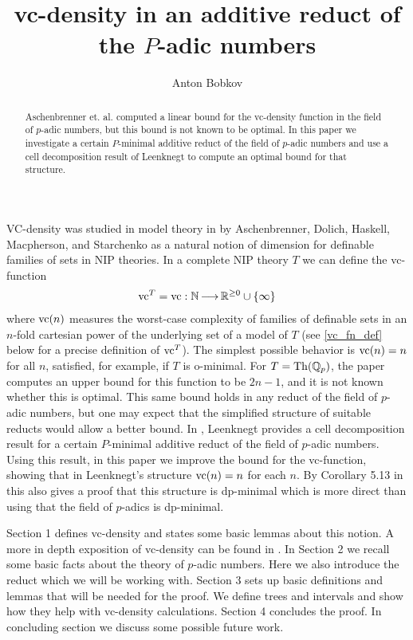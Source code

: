 \documentclass{amsart}
\title{vc-density in an additive reduct of the $P$-adic numbers}
\author{Anton Bobkov}
\begin{document}
\begin{abstract}
  Aschenbrenner et. al. computed a linear bound for the vc-density function in the field of $p$-adic numbers,
  but this bound is not known to be optimal.
  In this paper we investigate a certain $P$-minimal additive reduct of the field of $p$-adic numbers and
  use a cell decomposition result of Leenknegt to compute an optimal bound for that structure.
\end{abstract}

\maketitle

VC-density was studied in model theory in \cite{density} by Aschenbrenner, Dolich, Haskell, Macpherson, and Starchenko
as a natural notion of dimension for definable families of sets in NIP theories.
In a complete NIP theory $T$ we can define the vc-function
\begin{align*}
  \operatorname{vc}^T = \operatorname{vc} : \mathbb{N} \operatorname{\longrightarrow} \mathbb{R}^{\geq 0} \cup \left\{\infty\right\}
\end{align*}
where $\operatorname{vc}(n)$ measures the worst-case complexity of families of definable sets in an $n$-fold cartesian power of the underlying set of a model of $T$
(see \ref{vc_fn_def} below for a precise definition of $\operatorname{vc}^T$).
The simplest possible behavior is $\operatorname{vc}(n) = n$ for all $n$,
satisfied, for example, if $T$ is o-minimal.
For $T = \operatorname{Th}(\mathbb{Q}_p)$, the paper \cite{density} computes an upper bound for this function to be $2n-1$, and it is not known whether this is optimal.
This same bound holds in any reduct of the field of $p$-adic numbers, but one may expect that the simplified structure of suitable reducts would allow a better bound.
In \cite{reduct}, Leenknegt provides a cell decomposition result for a certain $P$-minimal additive reduct of the field of $p$-adic numbers.
Using this result, in this paper we improve the bound for the vc-function, showing that in Leenknegt's structure $\operatorname{vc}(n) = n$ for each $n$.
By Corollary 5.13 in \cite{density} this also gives a proof that this structure is dp-minimal which is more direct than using that the field of $p$-adics is dp-minimal.

Section 1 defines vc-density and states some basic lemmas about this notion.
A more in depth exposition of vc-density can be found in \cite{density}.
In Section 2 we recall some basic facts about the theory of $p$-adic numbers.
Here we also introduce the reduct which we will be working with.
Section 3 sets up basic definitions and lemmas that will be needed for the proof.
We define trees and intervals and show how they help with vc-density calculations.
Section 4 concludes the proof.
In concluding section we discuss some possible future work.
\end{document}
